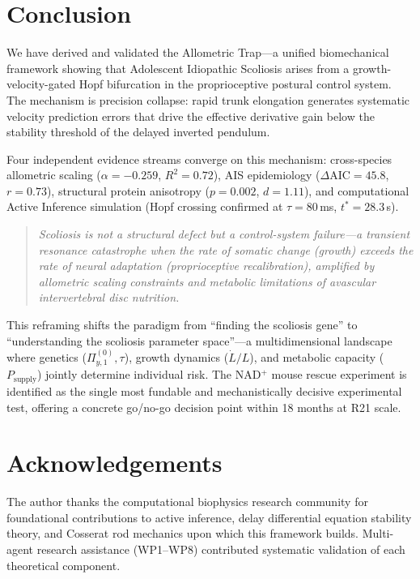 \documentclass[12pt, letterpaper]{article}
\newcommand{\Piy}{\Pi_{y,1}}
\newcommand{\DAIC}{\Delta\mathrm{AIC}}
\begin{document}
\section{Conclusion}

We have derived and validated the Allometric Trap---a unified biomechanical
framework showing that Adolescent Idiopathic Scoliosis arises from a
growth-velocity-gated Hopf bifurcation in the proprioceptive postural control
system. The mechanism is precision collapse: rapid trunk elongation generates
systematic velocity prediction errors that drive the effective derivative gain
below the stability threshold of the delayed inverted pendulum.

Four independent evidence streams converge on this mechanism:
cross-species allometric scaling ($\alpha = -0.259$, $R^{2} = 0.72$),
AIS epidemiology ($\DAIC = 45.8$, $r = 0.73$), structural protein anisotropy
($p = 0.002$, $d = 1.11$), and computational Active Inference simulation
(Hopf crossing confirmed at $\tau = 80$\,ms, $t^{*} = 28.3$\,s).

\begin{quote}
  \textit{Scoliosis is not a structural defect but a control-system failure---a
  transient resonance catastrophe when the rate of somatic change (growth)
  exceeds the rate of neural adaptation (proprioceptive recalibration), amplified
  by allometric scaling constraints and metabolic limitations of avascular
  intervertebral disc nutrition.}
\end{quote}

This reframing shifts the paradigm from ``finding the scoliosis gene'' to
``understanding the scoliosis parameter space''---a multidimensional landscape
where genetics ($\Piy^{(0)},\tau$), growth dynamics ($\dot{L}/L$), and metabolic
capacity ($P_{\mathrm{supply}}$) jointly determine individual risk. The NAD$^{+}$
mouse rescue experiment is identified as the single most fundable and mechanistically
decisive experimental test, offering a concrete go/no-go decision point within
18 months at R21 scale.

\section*{Acknowledgements}

The author thanks the computational biophysics research community for foundational
contributions to active inference, delay differential equation stability theory,
and Cosserat rod mechanics upon which this framework builds. Multi-agent research
assistance (WP1--WP8) contributed systematic validation of each theoretical component.
\end{document}
